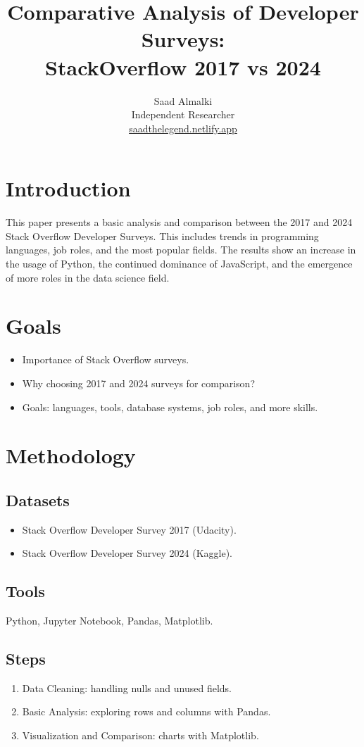 \documentclass[12pt,a4paper]{article}
\title{\textbf{Comparative Analysis of Developer Surveys: \\ StackOverflow 2017 vs 2024}}
\author{Saad Almalki \\ \small Independent Researcher \\ 
\href{https://saadthelegend.netlify.app}{saadthelegend.netlify.app}}
\date{}
\begin{document}
\maketitle

\section*{Introduction}
This paper presents a basic analysis and comparison between the 2017 and 2024 
Stack Overflow Developer Surveys. This includes trends in programming languages, 
job roles, and the most popular fields. The results show an increase in the usage 
of Python, the continued dominance of JavaScript, and the emergence of more 
roles in the data science field.

\section*{Goals}
\begin{itemize}
    \item Importance of Stack Overflow surveys.
    \item Why choosing 2017 and 2024 surveys for comparison?
    \item Goals: languages, tools, database systems, job roles, and more skills.
\end{itemize}

\section*{Methodology}
\subsection*{Datasets}
\begin{itemize}
    \item Stack Overflow Developer Survey 2017 (Udacity).
    \item Stack Overflow Developer Survey 2024 (Kaggle).
\end{itemize}

\subsection*{Tools}
Python, Jupyter Notebook, Pandas, Matplotlib.

\subsection*{Steps}
\begin{enumerate}
    \item Data Cleaning: handling nulls and unused fields.
    \item Basic Analysis: exploring rows and columns with Pandas.
    \item Visualization and Comparison: charts with Matplotlib.
\end{enumerate}
\end{document}

